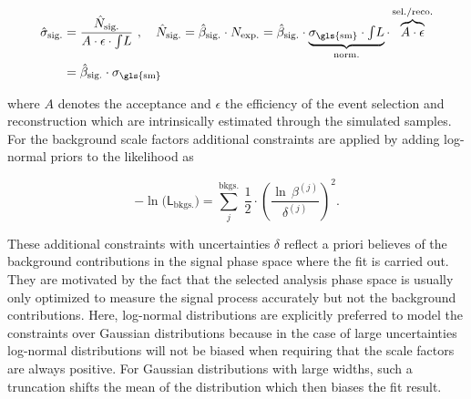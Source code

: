 \begin{align}
\hat{\sigma}_\mathrm{sig.}&=\frac{\hat{N}_\mathrm{sig.}}{A\cdot\epsilon\cdot{\textstyle{\int}L}}~,\quad
\hat{N}_\mathrm{sig.}=\hat{\beta}_\mathrm{sig.}\cdot N_\mathrm{exp.}=\hat{\beta}_\mathrm{sig.}\cdot\underbrace{\sigma_\mathrm{\gls{sm}}\cdot\textstyle{\int}L}_\mathrm{norm.}\cdot \overbrace{A \cdot \epsilon}^\mathrm{sel./reco.}\nonumber\\
&=\hat{\beta}_\mathrm{sig.}\cdot\sigma_\mathrm{\gls{sm}} \label{eq:technique-xsec-measurement}
\end{align}

where $A$ denotes the acceptance and $\epsilon$ the efficiency of the event selection and reconstruction which are intrinsically estimated through the simulated samples. For the background scale factors additional constraints are applied by adding log-normal priors to the likelihood as

\begin{equation}
-\ln\Big(\mathsf{L}_\mathrm{bkgs.}\Big)=\sum_{j}^\mathrm{bkgs.}~\frac{1}{2}\cdot\left(\frac{\ln\,\beta^{(j)}}{\delta^{(j)}}\right)^{2}.
\end{equation}

These additional constraints with uncertainties $\delta$ reflect a priori believes of the background contributions in the signal phase space where the fit is carried out. They are motivated by the fact that the selected analysis phase space is usually only optimized to measure the signal process accurately but not the background contributions. Here, log-normal distributions are explicitly preferred to model the constraints over Gaussian distributions because in the case of large uncertainties log-normal distributions will not be biased when requiring that the scale factors are always positive. For Gaussian distributions with large widths, such a truncation shifts the mean of the distribution which then biases the fit result.

